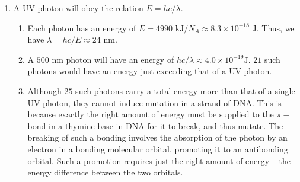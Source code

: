 \documentclass[10pt]{article}
\begin{document}
\begin{enumerate}
                \item A UV photon will obey the relation $E = hc/\lambda$.
                \begin{enumerate}
                        \item Each photon has an energy of $E = 4990 \text{ kJ} / N_A \approx 8.3 \times 10^{-18} \text{ J}$.
                        Thus, we have $\lambda = hc/E \approx 24 \text{ nm}$.
                        \item A $500 \text{ nm}$ photon will have an energy of $hc/\lambda \approx 4.0 \times 10^{-19} \text {J}$.
                        $21$ such photons would have an energy just exceeding that of a UV photon.
                        \item Although $25$ such photons carry a total energy more than that of a single UV photon, they cannot
                        induce mutation in a strand of DNA. This is because exactly the right amount of energy must be supplied
                        to the $\pi-$bond in a thymine base in DNA for it to break, and thus mutate. The breaking of such a bonding
                        involves the absorption of the photon by an electron in a bonding molecular orbital, promoting it to an antibonding orbital.
                        Such a promotion requires just the right amount of energy -- the energy difference between the two orbitals.
                \end{enumerate}
        \end{enumerate}
\end{document}
